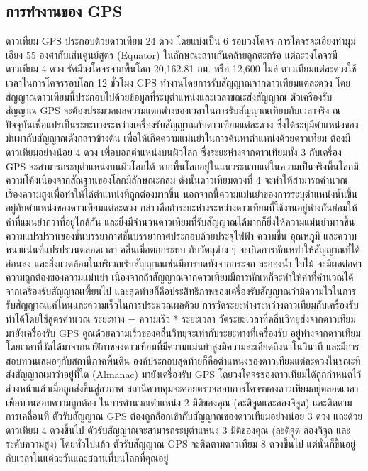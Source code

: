 \subsection{การทำงานของ GPS}
\quad ดาวเทียม GPS ประกอบด้วยดาวเทียม 24 ดวง โดยแบ่งเป็น 6 รอบวงโคจร การโคจรจะเอียงทำมุมเอียง 55 องศากับเส้นศูนย์สูตร (Equator) ในลักษณะสานกันคล้ายลูกตะกร้อ แต่ละวงโคจรมีดาวเทียม 4 ดวง รัศมีวงโคจรจากพื้นโลก 20,162.81 กม. หรือ 12,600 ไมล์ ดาวเทียมแต่ละดวงใช้ เวลาในการโคจรรอบโลก 12 ชั่วโมง 
\quad GPS ทำงานโดยการรับสัญญาณจากดาวเทียมแต่ละดวง โดยสัญญาณดาวเทียมนี้ประกอบไปด้วยข้อมูลที่ระบุตำแหน่งและเวลาขณะส่งสัญญาณ ตัวเครื่องรับสัญญาณ GPS จะต้องประมวลผลความแตกต่างของเวลาในการรับสัญญาณเทียบกับเวลาจริง ณ ปัจจุบันเพื่อแปรเป็นระยะทางระหว่างเครื่องรับสัญญาณกับดาวเทียมแต่ละดวง ซึ่งได้ระบุมีตำแหน่งของมันมากับสัญญาณดังกล่าวข้างต้น เพื่อให้เกิดความแม่นยำในการค้นหาตำแหน่งด้วยดาวเทียม ต้องมีดาวเทียมอย่างน้อย 4 ดวง เพื่อบอกตำแหน่งบนผิวโลก ซึ่งระยะห่างจากดาวเทียมทั้ง 3 กับเครื่อง GPS จะสามารถระบุตำแหน่งบนผิวโลกได้ หากพื้นโลกอยู่ในแนวระนาบแต่ในความเป็นจริงพื้นโลกมีความโค้งเนื่องจากสัณฐานของโลกมีลักษณะกลม ดังนั้นดาวเทียมดวงที่ 4 จะทำให้สามารถคำนวณเรื่องความสูงเพื่อทำให้ได้ตำแหน่งที่ถูกต้องมากขึ้น นอกจากนี้ความแม่นยำของการระบุตำแหน่งนั้นขึ้นอยู่กับตำแหน่งของดาวเทียมแต่ละดวง กล่าวคือถ้าระยะห่างระหว่างดาวเทียมที่ใช้งานอยู่ห่างกันย่อมให้ค่าที่แม่นยำกว่าที่อยู่ใกล้กัน และยิ่งมีจำนวนดาวเทียมที่รับสัญญาณได้มากก็ยิ่งให้ความแม่นยำมากขึ้น ความแปรปรวนของชั้นบรรยากาศชั้นบรรยากาศประกอบด้วยประจุไฟฟ้า ความชื้น อุณหภูมิ และความหนาแน่นที่แปรปรวนตลอดเวลา คลื่นเมื่อตกกระทบ กับวัตถุต่าง ๆ จะเกิดการหักเหทำให้สัญญาณที่ได้อ่อนลง และสิ่งแวดล้อมในบริเวณรับสัญญาณเช่นมีการบดบังจากกระจก ละอองน้ำ ใบไม้ จะมีผลต่อค่าความถูกต้องของความแม่นยำ เนื่องจากถ้าสัญญาณจากดาวเทียมมีการหักเหก็จะทำให้ค่าที่คำนวณได้จากเครื่องรับสัญญาณเพี้ยนไป และสุดท้ายก็คือประสิทธิภาพของเครื่องรับสัญญาณว่ามีความไวในการรับสัญญาณแค่ไหนและความเร็วในการประมวณผลด้วย 
\quad การวัดระยะห่างระหว่างดาวเทียมกับเครื่องรับทำได้โดยใช้สูตรคำนวณ ระยะทาง = ความเร็ว * ระยะเวลา วัดระยะเวลาที่คลื่นวิทยุส่งจากดาวเทียมมายังเครื่องรับ GPS คูณด้วยความเร็วของคลื่นวิทยุจะเท่ากับระยะทางที่เครื่องรับ อยู่ห่างจากดาวเทียม โดยเวลาที่วัดได้มาจากนาฬิกาของดาวเทียมที่มีความแม่นยำสูงมีความละเอียดถึงนาโนวินาที และมีการสอบทวนเสมอๆกับสถานีภาคพื้นดิน องค์ประกอบสุดท้ายก็คือตำแหน่งของดาวเทียมแต่ละดวงในขณะที่ส่งสัญญาณมาว่าอยู่ที่ใด (Almanac) มายังเครื่องรับ GPS โดยวงโคจรของดาวเทียมได้ถูกกำหนดไว้ล่วงหน้าแล้วเมื่อถูกส่งขึ้นสู่อวกาศ สถานีควบคุมจะคอยตรวจสอบการโคจรของดาวเทียมอยู่ตลอดเวลาเพื่อทวนสอบความถูกต้อง 
\quad ในการคำนวณตำแหน่ง 2 มิติของคุณ (ละติจูดและลองจิจูด) และติดตามการเคลื่อนที่ ตัวรับสัญญาณ GPS ต้องถูกล็อกเข้ากับสัญญาณของดาวเทียมอย่างน้อย 3 ดวง และด้วยดาวเทียม 4 ดวงขึ้นไป ตัวรับสัญญาณจะสามารถระบุตำแหน่ง 3 มิติของคุณ (ละติจูด ลองจิจูด และระดับความสูง) โดยทั่วไปแล้ว ตัวรับสัญญาณ GPS จะติดตามดาวเทียม 8 ดวงขึ้นไป แต่นั่นก็ขึ้นอยู่กับเวลาในแต่ละวันและสถานที่บนโลกที่คุณอยู่ 
\cite{gps} \cite{gps2}
